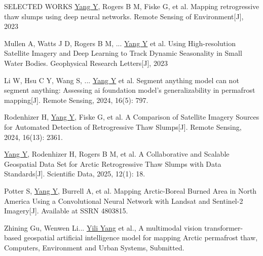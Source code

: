 \documentclass{resume} %
\begin{document}
\begin{rSection}{SELECTED WORKS}
\underline{Yang Y}, Rogers B M, Fiske G, et al. Mapping retrogressive thaw slumps using deep neural networks. Remote Sensing of Environment[J], 2023

Mullen A, Watts J D, Rogers B M, ... \underline{Yang Y} et al. Using High-resolution Satellite Imagery and Deep Learning to Track Dynamic Seasonality in Small Water Bodies. Geophysical Research Letters[J], 2023

Li W, Hsu C Y, Wang S, ... \underline{Yang Y} et al. Segment anything model can not segment anything: Assessing ai foundation model’s generalizability in permafrost mapping[J]. Remote Sensing, 2024, 16(5): 797.

Rodenhizer H, \underline{Yang Y}, Fiske G, et al. A Comparison of Satellite Imagery Sources for Automated Detection of Retrogressive Thaw Slumps[J]. Remote Sensing, 2024, 16(13): 2361.

\underline{Yang Y}, Rodenhizer H, Rogers B M, et al. A Collaborative and Scalable Geospatial Data Set for Arctic Retrogressive Thaw Slumps with Data Standards[J]. Scientific Data, 2025, 12(1): 18.

Potter S, \underline{Yang Y}, Burrell A, et al. Mapping Arctic-Boreal Burned Area in North America Using a Convolutional Neural Network with Landsat and Sentinel-2 Imagery[J]. Available at SSRN 4803815.

Zhining Gu, Wenwen Li... \underline{Yili Yang} et al., A multimodal vision transformer-based geospatial artificial intelligence model for mapping Arctic permafrost thaw, Computers, Environment and Urban Systems, Submitted.
\end{rSection}

\end{document}
